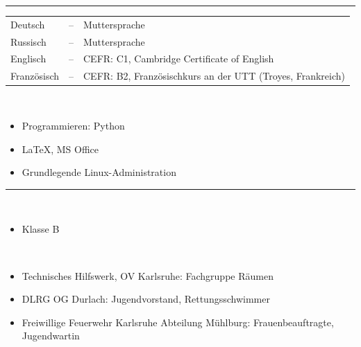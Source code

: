 \documentclass[a4paper,10pt]{article}
\newlength{\cvcolumngapwidth}
\newlength{\cvleftcolumnwidth}
\newlength{\cvrightcolumnwidth}
\newcommand{\cvsectionstyle}[1]{{\normalsize\textcolor{cvsectioncolor}{#1}}}
\newcommand{\cvheadingstyle}[1]{{\normalsize\textcolor{cvheadingcolor}{#1}}}
\newlength{\cvafteritemskipamount}
\newlength{\cvaftersectionskipamount}
\newlength{\cvbetweensectionandheadingextraskipamount}
\newlength{\cvparskip}
\newcommand{\cvsection}[1]{
    \begin{minipage}[t][][b]{\cvleftcolumnwidth}
        \raggedleft\cvsectionstyle{#1}
    \end{minipage}%
    \hspace{\cvcolumngapwidth}%
    \begin{minipage}[t]{\cvrightcolumnwidth}
        \textcolor{cvrulecolor}{\rule{\cvrightcolumnwidth}{0.3mm}}
    \end{minipage}

    \vspace{\cvaftersectionskipamount}
}
\newcommand{\cvitem}[2]{
    \begin{minipage}[t]{\cvleftcolumnwidth}
    \strut\vspace*{-\baselineskip}\newline %
    \raggedleft #1
    \end{minipage}%
    \hspace{\cvcolumngapwidth}%
    \begin{minipage}[t]{\cvrightcolumnwidth}
        \setlength{\parskip}{\cvparskip}
        \strut\vspace*{-\baselineskip}\newline #2 %
    \end{minipage}

    \vspace{\cvafteritemskipamount}
}
\begin{document}
\cvsection{KENNTNISSE}

\cvitem{\cvheadingstyle{Sprachen}}{
	\hspace*{-2mm}\begin{tabular}{lcl}
		Deutsch  & -- & Muttersprache \\
		Russisch & -- & Muttersprache \\
		Englisch & -- & CEFR: C1, Cambridge Certificate of English \\
		Französisch & -- & CEFR: B2, Französischkurs an der UTT (Troyes, Frankreich) \\
	\end{tabular}
}

\cvitem{\cvheadingstyle{EDV}}{
    \\[-5.5ex]\begin{itemize}[leftmargin=*]
    	\item Programmieren: Python
    	\item \LaTeX, MS Office
    	\item Grundlegende Linux-Administration
    \end{itemize}
}


\cvsection{WEITERE INFORMATIONEN}\vspace{\cvbetweensectionandheadingextraskipamount}
\cvitem{\cvheadingstyle{Führerschein}}{
	\\[-5.5ex]\begin{itemize}[leftmargin=*]
     \item Klasse B
    \end{itemize}
}

\cvitem{\cvheadingstyle{Ehrenamt}}{
	\\[-5.5ex]\begin{itemize}[leftmargin=*]
	        \item Technisches Hilfswerk, OV Karlsruhe: Fachgruppe Räumen
	        \item DLRG OG Durlach: Jugendvorstand, Rettungsschwimmer
	        \item Freiwillige Feuerwehr Karlsruhe Abteilung Mühlburg: Frauenbeauftragte, Jugendwartin
	\end{itemize}
}
\end{document}
